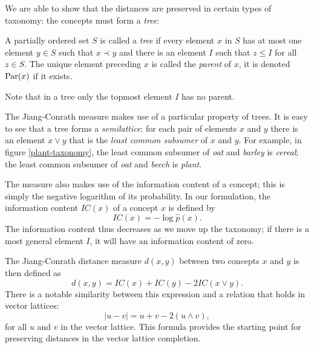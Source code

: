 
We are able to show that the distances are preserved in certain types of taxonomy: the concepts must form a \emph{tree}:
\begin{defn}[Trees]
A partially ordered set $S$ is called a \emph{tree} if every element $x$ in $S$ has at most one element $y\in S$ such that $x \prec y$ and there is an element $I$ such that $z \le I$ for all $z \in S$. The unique element preceding $x$ is called the \emph{parent} of $x$, it is denoted $\mathrm{Par}(x)$ if it exists.
\end{defn}\noindent
Note that in a tree only the topmost element $I$ has no parent.

The Jiang-Conrath measure makes use of a particular property of trees. It is easy to see that a tree forms a \emph{semilattice}: for each pair of elements $x$ and $y$ there is an element $x \lor y$ that is the \emph{least common subsumer} of $x$ and $y$. For example, in figure \ref{plant-taxonomy}, the least common subsumer of \emph{oat} and \emph{barley} is \emph{cereal}; the least common subsumer of \emph{oat} and \emph{beech} is \emph{plant}.

The measure also makes use of the information content of a concept; this is simply the negative logarithm of its probability. In our formulation, the information content $\mathit{IC}(x)$ of a concept $x$ is defined by
$$\mathit{IC}(x) = -\log \hat{p}(x).$$
The information content thus decreases as we move up the taxonomy; if there is a most general element $I$, it will have an information content of zero.

The Jiang-Conrath distance measure $d(x,y)$ between two concepts $x$ and $y$ is then defined as
$$d(x,y) = \mathit{IC}(x) + \mathit{IC}(y) - 2\mathit{IC}(x\lor y).$$
There is a notable similarity between this expression and a relation that holds in vector lattices:
\begin{equation*}\tag{$*$}\label{vlid}|u - v| = u + v - 2(u\land v),\end{equation*}
for all $u$ and $v$ in the vector lattice. This formula provides the starting point for preserving distances in the vector lattice completion.

